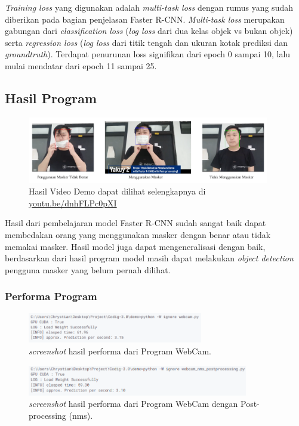 \documentclass{article}
\begin{document}
  \par \textit{Training loss} yang digunakan adalah \textit{multi-task loss} dengan rumus yang sudah diberikan pada bagian penjelasan Faster R-CNN. \textit{Multi-task loss} merupakan gabungan dari \textit{classification loss} (\textit{log loss} dari dua kelas objek vs bukan objek) serta \textit{regression loss} (\textit{log loss} dari titik tengah dan ukuran kotak prediksi dan \textit{groundtruth}). Terdapat penurunan loss signifikan dari epoch 0 sampai 10, lalu mulai mendatar dari epoch 11 sampai 25.
  
  \subsection{Hasil Program}
  
  \begin{figure}[H]
	\centering
	\includegraphics[width=400px]{./images/implementasi/hasil1.png}
	\caption{Hasil Video Demo dapat dilihat selengkapnya di \href{https://youtu.be/dnhFLPc0pXI}{youtu.be/dnhFLPc0pXI}}
  \end{figure}
  \par Hasil dari pembelajaran model Faster R-CNN sudah sangat baik dapat membedakan orang yang menggunakan masker dengan benar atau tidak memakai masker. Hasil model juga dapat mengeneralisasi dengan baik, berdasarkan dari hasil program model masih dapat melakukan \textit{object detection} pengguna masker yang belum pernah dilihat. 
  \subsubsection{Performa Program}

  
  
  \begin{figure}[H]
	\centering
	\includegraphics[height=50px]{benchmark/hasil1.png}
	\caption{\textit{screenshot} hasil performa dari Program WebCam.}
  \end{figure}

  \begin{figure}[H]
	\centering
	\includegraphics[height=50px]{benchmark/hasil2.png}
	\caption{\textit{screenshot} hasil performa dari Program WebCam dengan Post-processing (nms).}
  \end{figure}
\end{document}
